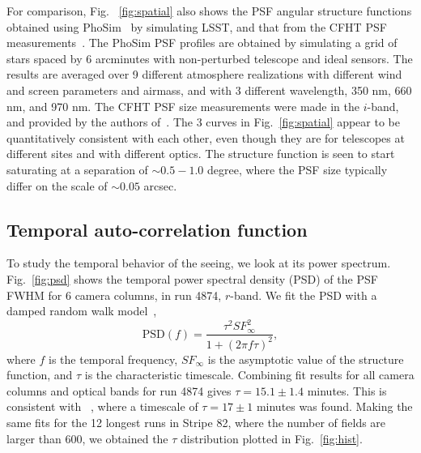 For comparison, Fig. ~\ref{fig:spatial} also shows the PSF angular
structure functions obtained using PhoSim~\citep{phosim} by simulating LSST,
and that from the CFHT PSF measurements~\citep{heymans2012}.
The PhoSim PSF profiles are obtained by simulating a grid of stars
spaced by 6 arcminutes with non-perturbed telescope and ideal sensors.
The results are averaged over 9 different atmosphere realizations with
different wind and screen parameters and airmass, and with 3 different
wavelength, 350 nm, 660 nm, and 970 nm.
The CFHT PSF size measurements were made in the $i$-band, and provided
by the authors of~\cite{heymans2012}.
The 3 curves in Fig.~\ref{fig:spatial} appear to be quantitatively
consistent with each other, even though they are for telescopes at
different sites and with different optics.
The structure function is seen to start saturating at a separation of
$\sim 0.5 - 1.0$ degree, where the PSF size typically differ on the
scale of $\sim 0.05$ arcsec.

\subsection{Temporal auto-correlation function}

To study the temporal behavior of the seeing, we look at its
 power spectrum.
Fig.~\ref{fig:psd} shows the temporal power spectral density (PSD) of the
PSF FWHM for 6 camera columns, in run 4874, $r$-band.
We fit the PSD with a damped random walk model~\citep{zeljkoBook},
\begin{equation}
\textrm{PSD}(f) = \frac{\tau^2 SF^2_{\infty}}{1+(2\pi f \tau)^2},
\end{equation}
where $f$ is the temporal frequency, $SF_{\infty}$ is the asymptotic
value of the structure function, and $\tau$ is the
characteristic timescale.
Combining fit results for all camera columns and optical bands for run 4874
gives $\tau = 15.1 \pm 1.4$ minutes.
This is consistent with ~\cite{Racine1996}, where a timescale of 
$\tau = 17 \pm 1$ minutes was found.
Making the same fits for the 12 longest runs in Stripe 82, where the
number of fields are
larger than 600, we obtained the $\tau$ distribution plotted in Fig.~\ref{fig:hist}.

